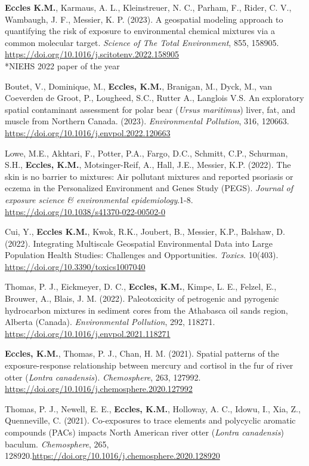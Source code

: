 \documentclass[margin,line]{res}
\begin{document}
\begin{resume}
\textbf{Eccles K.M.}, Karmaus, A. L., Kleinstreuer, N. C., Parham, F., Rider, C. V., Wambaugh, J. F., Messier, K. P. (2023). A geospatial modeling approach to quantifying the risk of exposure to environmental chemical mixtures via a common molecular target. \textit{Science of The Total Environment}, 855, 158905. \url{https://doi.org/10.1016/j.scitotenv.2022.158905}\\
\mbox{*}NIEHS 2022 paper of the year

Boutet, V., Dominique, M., \textbf{Eccles, K.M.}, Branigan, M., Dyck, M., van Coeverden de Groot, P., Lougheed, S.C., Rutter A., Langlois V.S. An exploratory spatial contaminant assessment for polar bear (\textit{Ursus maritimus}) liver, fat, and muscle from Northern Canada. (2023). \textit{Environmental Pollution}, 316, 120663. \url{https://doi.org/10.1016/j.envpol.2022.120663}

Lowe, M.E., Akhtari, F., Potter, P.A., Fargo, D.C., Schmitt, C.P., Schurman, S.H., \textbf{Eccles, K.M.}, Motsinger-Reif, A., Hall, J.E., Messier, K.P. (2022). The skin is no barrier to mixtures: Air pollutant mixtures and reported
psoriasis or eczema in the Personalized Environment and Genes Study (PEGS). \textit{Journal of exposure science \& environmental epidemiology}.1-8. \url{https://doi.org/10.1038/s41370-022-00502-0}

Cui, Y., \textbf{Eccles K.M.}, Kwok, R.K., Joubert, B., Messier, K.P., Balshaw, D. (2022). Integrating Multiscale Geospatial Environmental Data into Large Population Health Studies: Challenges and Opportunities. \textit{Toxics}. 10(403). \url{https://doi.org/10.3390/toxics1007040}

 Thomas, P. J., Eickmeyer, D. C., \textbf{Eccles, K.M.}, Kimpe, L. E., Felzel, E., Brouwer, A., Blais, J. M. (2022). Paleotoxicity of petrogenic and pyrogenic hydrocarbon mixtures in sediment cores from the Athabasca oil sands region, Alberta (Canada). \textit{Environmental Pollution}, 292, 118271. \url{https://doi.org/10.1016/j.envpol.2021.118271}

\textbf{Eccles, K.M.}, Thomas, P. J., Chan, H. M. (2021). Spatial patterns of the exposure-response relationship between mercury and cortisol in the fur of river otter (\textit{Lontra canadensis}). \textit{Chemosphere}, 263, 127992. \url{https://doi.org/10.1016/j.chemosphere.2020.127992}

Thomas, P. J., Newell, E. E., \textbf{Eccles, K.M.}, Holloway, A. C., Idowu, I., Xia, Z., Quenneville, C. (2021). Co-exposures to trace elements and polycyclic aromatic compounds (PACs) impacts North American river otter (\textit{Lontra canadensis}) baculum. \textit{Chemosphere}, 265, 128920.\url{https://doi.org/10.1016/j.chemosphere.2020.128920}


\end{resume}
\end{document}
